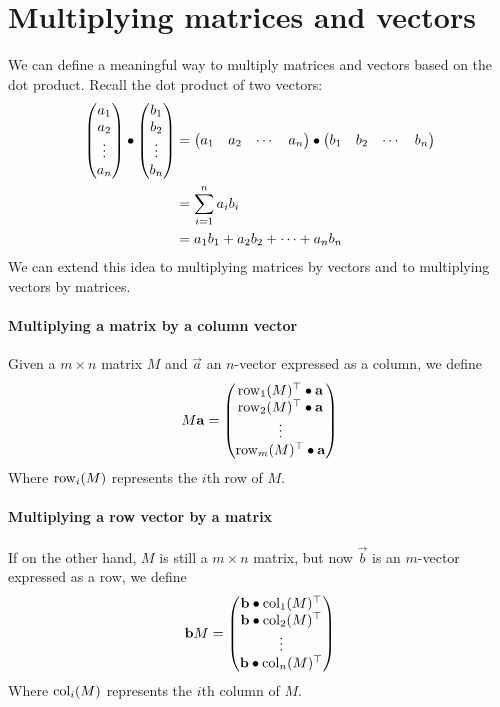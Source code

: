 \documentclass{ximera}
\begin{document}
\section{Multiplying matrices and vectors}

We can define a meaningful way to multiply matrices and vectors based
on the dot product.  Recall the dot product of two vectors:
\begin{align*}
  \begin{pmatrix}
    a_1\\
    a_2\\
    \vdots\\
    a_n
  \end{pmatrix}
  \bullet
  \begin{pmatrix}
    b_1\\
    b_2\\
    \vdots\\
    b_n
  \end{pmatrix}
  &=\begin{pmatrix} a_1 & a_2 & \cdots & a_n\end{pmatrix}\bullet\begin{pmatrix} b_1 & b_2 & \cdots & b_n\end{pmatrix}\\
  &= \sum_{i=1}^n a_ib_i\\
  &= a_1b_1 + a_2b_2 +\dots+a_nb_n
\end{align*}
We can extend this idea to multiplying matrices by vectors and to
multiplying vectors by matrices.

\paragraph{Multiplying a matrix by a column vector}

Given a $m\times n$ matrix $M$ and $\vec{a}$ an $n$-vector
expressed as a column, we define
\[
M \mathbf{a} =
\begin{pmatrix}
  \operatorname{row}_1(M)^\top \bullet \mathbf{a} \\
  \operatorname{row}_2(M)^\top \bullet \mathbf{a} \\
  \vdots \\
  \operatorname{row}_m(M)^\top \bullet \mathbf{a}
\end{pmatrix}
\]
Where $\operatorname{row}_i(M)$ represents the $i$th row of $M$.



\paragraph{Multiplying a row vector by a matrix}
If on the other hand, $M$ is still a $m\times n$ matrix, but now
$\vec{b}$ is an $m$-vector expressed as a row, we define
\[
\mathbf{b} M =
\begin{pmatrix}
  \mathbf{b}\bullet \operatorname{col}_1(M)^\top \\
  \mathbf{b}\bullet \operatorname{col}_2(M)^\top \\
  \vdots \\
  \mathbf{b}\bullet \operatorname{col}_n(M)^\top
\end{pmatrix}
\]
Where $\operatorname{col}_i(M)$ represents the $i$th column of $M$.
\end{document}
